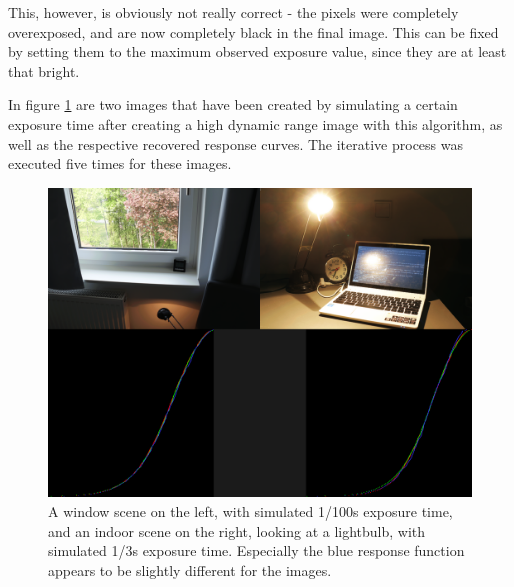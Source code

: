 This, however, is obviously not really correct - the pixels were completely
overexposed, and are now completely black in the final image. This can be fixed
by setting them to the maximum observed exposure value, since they are at least
that bright.

In figure \ref{fig:hdr} are two images that have been created by simulating a
certain exposure time after creating a high dynamic range image with this
algorithm, as well as the respective recovered response curves. The iterative
process was executed five times for these images.

\begin{figure}[h]
  \centering
  \includegraphics[width=\textwidth]{hdr.png}
  \caption{A window scene on the left, with simulated 1/100s exposure time, and
  an indoor scene on the right, looking at a lightbulb, with simulated 1/3s
  exposure time. Especially the blue response function appears to be slightly
  different for the images.}
  \label{fig:hdr}
\end{figure}
